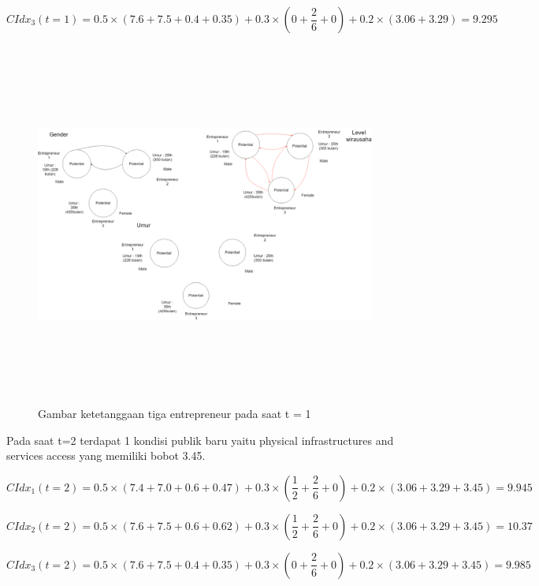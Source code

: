 \begin{equation}
	CIdx_{3}(t=1) = 0.5 \times (7.6 + 7.5 + 0.4 + 0.35) + 0.3 \times (0 + \frac {2} {6} + 0) + 0.2 \times (3.06 + 3.29) = 9.295
\end{equation}

	\begin{figure} [H]
		\centering  
		\includegraphics[width=18cm, height=12cm]{gambarwirausaha(t=1)} 
		\caption[Gambar ketetanggaan tiga entrepreneur pada saat t = 1]{Gambar ketetanggaan tiga entrepreneur pada saat t = 1} 
		\label{fig:t0} 
	\end{figure}

Pada saat t=2 terdapat 1 kondisi publik baru yaitu physical infrastructures and services access yang memiliki bobot 3.45.


\begin{equation}
	CIdx_{1}(t=2) = 0.5 \times (7.4 + 7.0 + 0.6 + 0.47) + 0.3 \times (\frac {1} {2} + \frac {2} {6}  + 0) + 0.2 \times (3.06 + 3.29 + 3.45) = 9.945
\end{equation}

\begin{equation}
	CIdx_{2}(t=2) = 0.5 \times (7.6 + 7.5 + 0.6 + 0.62) + 0.3 \times (\frac {1} {2} + \frac {2} {6} + 0) + 0.2 \times (3.06 + 3.29 + 3.45) = 10.37
\end{equation}

\begin{equation}
	CIdx_{3}(t=2) = 0.5 \times (7.6 + 7.5 + 0.4 + 0.35) + 0.3 \times (0 + \frac {2} {6} + 0) + 0.2 \times (3.06 + 3.29+ 3.45) = 9.985
\end{equation}

